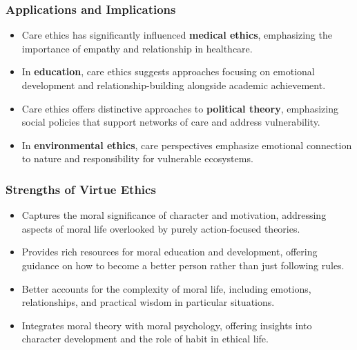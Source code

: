 \documentclass{beamer}
\begin{document}
\begin{frame}
    \frametitle{Applications and Implications}
    \begin{itemize}
        \item Care ethics has significantly influenced \textbf{medical ethics}, emphasizing the importance of empathy and relationship in healthcare.
        
        \item In \textbf{education}, care ethics suggests approaches focusing on emotional development and relationship-building alongside academic achievement.
        
        \item Care ethics offers distinctive approaches to \textbf{political theory}, emphasizing social policies that support networks of care and address vulnerability.
        
        \item In \textbf{environmental ethics}, care perspectives emphasize emotional connection to nature and responsibility for vulnerable ecosystems.
    \end{itemize}
\end{frame}


\begin{frame}
    \frametitle{Strengths of Virtue Ethics}
    \begin{itemize}
        \item Captures the moral significance of character and motivation, addressing aspects of moral life overlooked by purely action-focused theories.
        
        \item Provides rich resources for moral education and development, offering guidance on how to become a better person rather than just following rules.
        
        \item Better accounts for the complexity of moral life, including emotions, relationships, and practical wisdom in particular situations.
        
        \item Integrates moral theory with moral psychology, offering insights into character development and the role of habit in ethical life.
    \end{itemize}
\end{frame}
\end{document}
